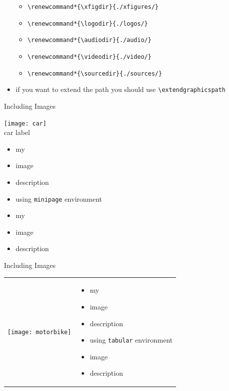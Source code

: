 \documentclass[11pt,a4paper,landscape]{article}
\begin{document}
\begin{itemize}
\begin{footnotesize}
\begin{itemize}
    \item[] \texttt{\textbackslash renewcommand*\{\textbackslash xfigdir\}\{./xfigures/\}}
    \item[] \texttt{\textbackslash renewcommand*\{\textbackslash logodir\}\{./logos/\}}
    \item[] \texttt{\textbackslash renewcommand*\{\textbackslash audiodir\}\{./audio/\}}
    \item[] \texttt{\textbackslash renewcommand*\{\textbackslash videodir\}\{./video/\}}
    \item[] \texttt{\textbackslash renewcommand*\{\textbackslash sourcedir\}\{./sources/\}}
    \end{itemize}
  \end{footnotesize}
\item if you want to \alert{extend} the path you should use
  \texttt{\textbackslash extendgraphicspath}
\end{itemize}
\vfill

\NewPage\centerline{Including Images}
\vfill
\begin{minipage}[b]{.5\linewidth}
  \begin{center}
    \texttt{[image: car]}\\
    car label
  \end{center}
\end{minipage}
\begin{minipage}[b]{.5\linewidth}
  \begin{itemize}
  \item my
  \item image
  \item description
  \item using \texttt{minipage} environment
  \item my
  \item image
  \item description
  \end{itemize}
\end{minipage}
\vfill

\NewPage\centerline{Including Images}
\vfill
\begin{table}
  \centering
  \begin{tabular}{@{} M{.3\linewidth} M{.7\linewidth} @{}}
    \texttt{[image: motorbike]}
    & 
    \begin{itemize}
    \item my
    \item image
    \item description
    \item using \texttt{tabular} environment
    \item image
    \item description
    \end{itemize}
  \end{tabular}
\end{table}
\vfill
\end{document}
